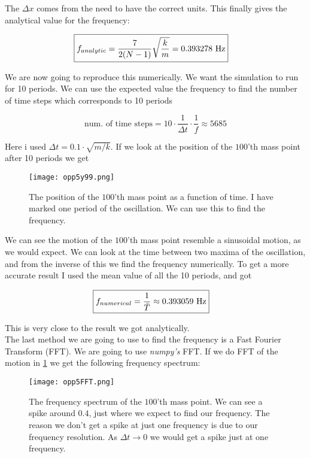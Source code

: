 \documentclass[a4paper,norsk, 10pt]{article}
\begin{document}
The $\Delta x$ comes from the need to have the correct units. This finally gives the analytical value for the frequency:

\begin{align}
\Aboxed{
f_{analytic} = \frac{7}{2(N-1)}\sqrt{\frac{k}{m}} = 0.393278\text{ Hz}
}
\end{align}

We are now going to reproduce this numerically. We want the simulation to run for 10 periods. We can use the expected value the frequency to find the number of time steps which corresponds to 10 periods

\begin{equation}
\text{num. of time steps} = 10\cdot \frac{1}{\Delta t}\cdot \frac{1}{f} \approx 5685
\end{equation}

Here i used $\Delta t = 0.1\cdot\sqrt{m/k}$. If we look at the position of the $100$'th mass point after 10 periods we get

\begin{figure}[H]
\centering
\texttt{[image: opp5y99.png]}
\caption{The position of the $100$'th mass point as a function of time. I have marked one period of the oscillation. We can use this to find the frequency.}
\label{fig:y99}
\end{figure}

We can see the motion of the $100$'th mass point resemble a sinusoidal motion, as we would expect. We can look at the time between two maxima of the oscillation, and from the inverse of this we find the frequency numerically. To get a more accurate result I used the mean value of all the 10 periods, and got

\begin{align}
\Aboxed{f_{numerical} = \frac{1}{\bar{T}} \approx 0.393059 \text{ Hz}}
\end{align}

This is very close to the result we got analytically.\\

The last method we are going to use to find the frequency is a Fast Fourier Transform (FFT). We are going to use \textit{numpy's} FFT. If we do FFT of the motion in \ref{fig:y99} we get the following frequency spectrum:

\begin{figure}[H]
\centering
\texttt{[image: opp5FFT.png]}
\caption{The frequency spectrum of the $100$'th mass point. We can see a spike around $0.4$, just where we expect to find our frequency. The reason we don't get a spike at just one frequency is due to our frequency resolution. As $\Delta t \rightarrow 0$ we would get a spike just at one frequency.}
\label{fig:FFTy99}
\end{figure}
\end{document}
